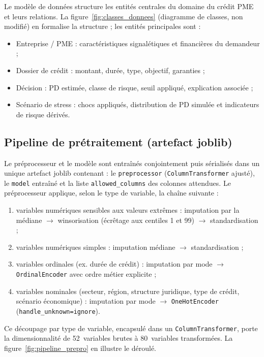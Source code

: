 \documentclass[a4paper,12pt,oneside]{report}
\begin{document}
Le modèle de données structure les entités centrales du domaine du crédit PME et
leurs relations. La figure~\ref{fig:classes_donnees} (diagramme de classes, non
modifié) en formalise la structure ; les entités principales sont :

\begin{itemize}
  \item Entreprise / PME : caractéristiques signalétiques et financières du
        demandeur ;
  \item Dossier de crédit : montant, durée, type, objectif, garanties ;
  \item Décision : PD estimée, classe de risque, seuil appliqué, explication
        associée ;
  \item Scénario de stress : chocs appliqués, distribution de PD simulée et
        indicateurs de risque dérivés.
\end{itemize}

\subsection{Pipeline de prétraitement (artefact joblib)}

Le préprocesseur et le modèle sont entraînés conjointement puis sérialisés dans un
unique artefact joblib contenant : le \texttt{preprocessor}
(\texttt{ColumnTransformer} ajusté), le \texttt{model} entraîné et la liste
\texttt{allowed\_columns} des colonnes attendues. Le préprocesseur applique, selon le
type de variable, la chaîne suivante :

\begin{enumerate}
  \item variables numériques sensibles aux valeurs extrêmes : imputation par
        la médiane $\rightarrow$ winsorisation (écrêtage aux centiles 1 et 99)
        $\rightarrow$ standardisation ;
  \item variables numériques simples : imputation médiane $\rightarrow$
        standardisation ;
  \item variables ordinales (ex. durée de crédit) : imputation par mode
        $\rightarrow$ \texttt{OrdinalEncoder} avec ordre métier explicite ;
  \item variables nominales (secteur, région, structure juridique, type de
        crédit, scénario économique) : imputation par mode $\rightarrow$
        \texttt{OneHotEncoder} (\texttt{handle\_unknown=ignore}).
\end{enumerate}

Ce découpage par type de variable, encapsulé dans un \texttt{ColumnTransformer},
porte la dimensionnalité de 52~variables brutes à 80~variables transformées.
La figure~\ref{fig:pipeline_prepro} en illustre le déroulé.
\end{document}
